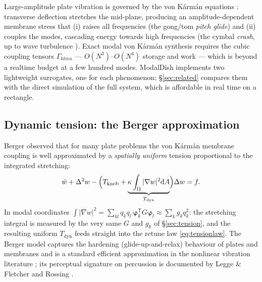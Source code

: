 \documentclass[11pt,a4paper]{article}
\newcommand{\lap}{\Delta}
\newcommand{\bilap}{\Delta^2}
\newcommand{\dd}{\mathrm{d}}
\begin{document}
Large-amplitude plate vibration is governed by the von K\'arm\'an
equations \cite{vonkarman,chu-herrmann}: transverse deflection stretches
the mid-plane, producing an amplitude-dependent membrane stress that (i)
raises all frequencies (the gong/tom \emph{pitch glide}) and (ii) couples
the modes, cascading energy towards high frequencies (the cymbal
\emph{crash}, up to wave turbulence \cite{touze-turbulence}). Exact modal
von K\'arm\'an synthesis requires the cubic coupling tensors
$\Gamma_{klmn}$ --- $O(N^3)$--$O(N^4)$ storage and work
\cite{ducceschi-touze,bilbao-vk} --- which is beyond a realtime budget at
a few hundred modes. ModalDish implements two lightweight surrogates, one for each
phenomenon; \S\ref{sec:related} compares them with the direct simulation
of the full system, which is affordable in real time on a rectangle.

\subsection{Dynamic tension: the Berger approximation}
\label{sec:berger}

Berger \cite{berger} observed that for many plate problems the von
K\'arm\'an membrane coupling is well approximated by a \emph{spatially
uniform} tension proportional to the integrated stretching:
%
\begin{equation}
  \ddot w + \bilap w
  - \Bigl( T_{\mathrm{knob}}
     + \underbrace{\kappa \int_\Omega |\nabla w|^2 \dd A}_{T_{\mathrm{dyn}}}
    \Bigr) \lap w = f .
  \label{eq:berger}
\end{equation}
%
In modal coordinates
$\int |\nabla w|^2 = \sum_{kl} q_k q_l\, \bm\varphi_k^{\mathsf T} G
\bm\varphi_l \approx \sum_k g_k q_k^2$: the stretching integral is measured
by the very same $G$ and $g_k$ of \S\ref{sec:tension}, and the resulting
uniform $T_{\mathrm{dyn}}$ feeds straight into the retune law
\eqref{eq:tensionlaw}. The Berger model captures the hardening
(glide-up-and-relax) behaviour of plates and membranes and is a standard
efficient approximation in the nonlinear vibration literature
\cite{berger,nayfeh}; its perceptual signature on percussion is documented
by Legge \& Fletcher and Rossing \cite{legge-fletcher,fletcher-rossing}.
\end{document}
